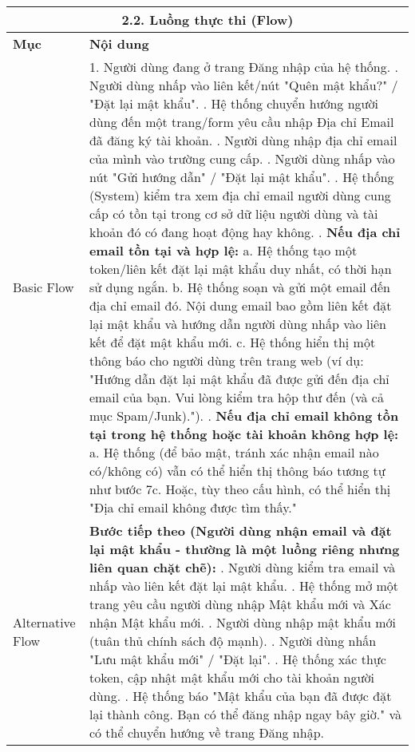 \begin{longtable}{|m{4cm}|p{11cm}|}
\hline
\multicolumn{2}{|c|}{\textbf{2.2. Luồng thực thi (Flow)}} \\
\hline
\textbf{Mục} & \textbf{Nội dung} \\
\hline
Basic Flow & 1. Người dùng đang ở trang Đăng nhập của hệ thống. \newline 2. Người dùng nhấp vào liên kết/nút "Quên mật khẩu?" / "Đặt lại mật khẩu". \newline 3. Hệ thống chuyển hướng người dùng đến một trang/form yêu cầu nhập Địa chỉ Email đã đăng ký tài khoản. \newline 4. Người dùng nhập địa chỉ email của mình vào trường cung cấp. \newline 5. Người dùng nhấp vào nút "Gửi hướng dẫn" / "Đặt lại mật khẩu". \newline 6. Hệ thống (System) kiểm tra xem địa chỉ email người dùng cung cấp có tồn tại trong cơ sở dữ liệu người dùng và tài khoản đó có đang hoạt động hay không. \newline 7. \textbf{Nếu địa chỉ email tồn tại và hợp lệ:} \newline    a. Hệ thống tạo một token/liên kết đặt lại mật khẩu duy nhất, có thời hạn sử dụng ngắn. \newline    b. Hệ thống soạn và gửi một email đến địa chỉ email đó. Nội dung email bao gồm liên kết đặt lại mật khẩu và hướng dẫn người dùng nhấp vào liên kết để đặt mật khẩu mới. \newline    c. Hệ thống hiển thị một thông báo cho người dùng trên trang web (ví dụ: "Hướng dẫn đặt lại mật khẩu đã được gửi đến địa chỉ email của bạn. Vui lòng kiểm tra hộp thư đến (và cả mục Spam/Junk)."). \newline 8. \textbf{Nếu địa chỉ email không tồn tại trong hệ thống hoặc tài khoản không hợp lệ:} \newline    a. Hệ thống (để bảo mật, tránh xác nhận email nào có/không có) vẫn có thể hiển thị thông báo tương tự như bước 7c. Hoặc, tùy theo cấu hình, có thể hiển thị "Địa chỉ email không được tìm thấy." \\
\hline
Alternative Flow & \textbf{Bước tiếp theo (Người dùng nhận email và đặt lại mật khẩu - thường là một luồng riêng nhưng liên quan chặt chẽ):} \newline    1. Người dùng kiểm tra email và nhấp vào liên kết đặt lại mật khẩu. \newline    2. Hệ thống mở một trang yêu cầu người dùng nhập Mật khẩu mới và Xác nhận Mật khẩu mới. \newline    3. Người dùng nhập mật khẩu mới (tuân thủ chính sách độ mạnh). \newline    4. Người dùng nhấn "Lưu mật khẩu mới" / "Đặt lại". \newline    5. Hệ thống xác thực token, cập nhật mật khẩu mới cho tài khoản người dùng. \newline    6. Hệ thống báo "Mật khẩu của bạn đã được đặt lại thành công. Bạn có thể đăng nhập ngay bây giờ." và có thể chuyển hướng về trang Đăng nhập. \\

\end{longtable}
